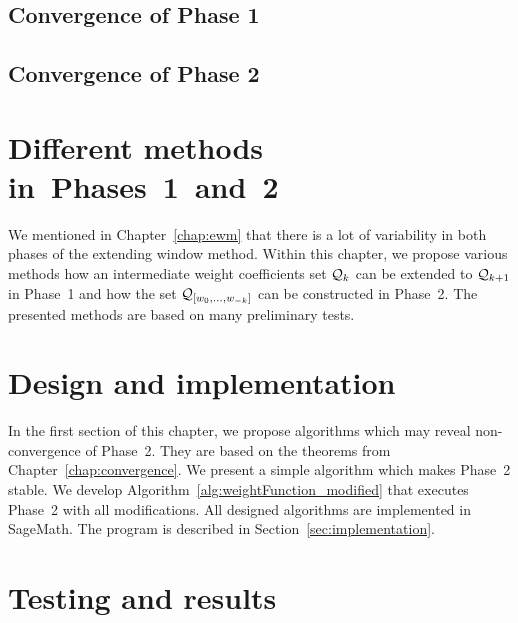 	\section{Convergence of Phase 1}
	

	\section{Convergence of Phase 2}
	
	

	


\chapter{Different methods in~Phases~1~and~2}
	\label{chap:diffChoices}
	We mentioned in Chapter~\ref{chap:ewm} that there is a lot of variability in both phases of the extending window method. Within this chapter, we propose various methods how an intermediate weight coefficients set $\mathcal{Q}_k$ can be extended to $\mathcal{Q}_{k+1}$ in Phase~1 and how the set $\mathcal{Q}_{[w_{0}, \dots, w_{-k}]}$ can be constructed in Phase~2. The presented methods are based on many preliminary tests.

	

	

	
	


\chapter{Design and implementation}

In the first section of this chapter, we propose algorithms which may reveal non-con\-ver\-gen\-ce of Phase~2. They are based on the theorems from Chapter~\ref{chap:convergence}. We present a simple algorithm which makes Phase~2 stable. We develop Algorithm~\ref{alg:weightFunction_modified} that executes  Phase~2 with all modifications. All designed algorithms are implemented in SageMath. The program is described in Section~\ref{sec:implementation}.
\label{chap:design}
	
	

\chapter{Testing and results}
\label{chap:testing}
	


\cleardoublepage{}
{}
